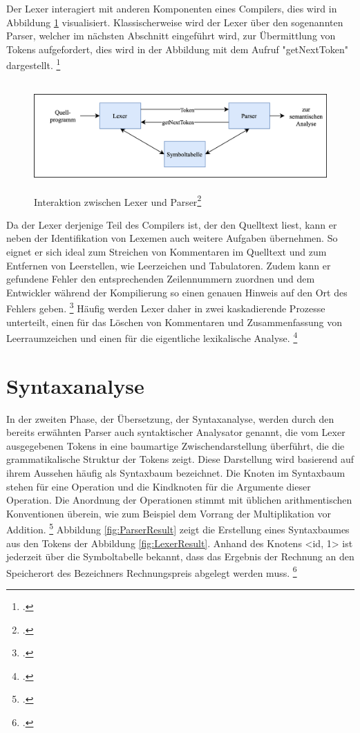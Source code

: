Der Lexer interagiert mit anderen Komponenten eines Compilers,  dies wird in Abbildung \ref{fig:LexerInteraktionen} visualisiert.  Klassischerweise wird der Lexer über den sogenannten Parser, welcher im nächsten Abschnitt eingeführt wird,  zur Übermittlung von Tokens aufgefordert,  dies wird in der Abbildung mit dem Aufruf "getNextToken" dargestellt.  \footcite[Vgl.][S. 135]{Ullmann2008} 

\begin{figure}[!ht]
 \includegraphics[width=14.5cm,height=4.11cm]{Images/Compiler/LexerParser.png}
 \caption[Interaktion zwischen Lexer und Parser]{Interaktion zwischen Lexer und Parser\protect\footcite{Ullmann2008}}
 \label{fig:LexerInteraktionen}
\end{figure}

Da der Lexer derjenige Teil des Compilers ist, der den Quelltext liest, kann er neben der Identifikation von Lexemen auch weitere Aufgaben übernehmen. So eignet er sich ideal zum Streichen von Kommentaren im Quelltext und zum Entfernen von Leerstellen,  wie Leerzeichen und Tabulatoren.  Zudem kann er gefundene Fehler den entsprechenden Zeilennummern zuordnen und dem Entwickler während der Kompilierung so einen genauen Hinweis auf den Ort des Fehlers geben.  \footcite[Vgl.][S. 135.]{Ullmann2008} 
Häufig werden Lexer daher in zwei kaskadierende Prozesse unterteilt, einen für das Löschen von Kommentaren und Zusammenfassung von Leerraumzeichen und einen für die eigentliche lexikalische Analyse.  \footcite[Vgl.][S. 136.]{Ullmann2008} 

\section{Syntaxanalyse}
In der zweiten Phase, der Übersetzung, der Syntaxanalyse,  werden durch den bereits erwähnten Parser auch syntaktischer Analysator genannt,  die vom Lexer ausgegebenen Tokens in eine baumartige Zwischendarstellung überführt, die die grammatikalische Struktur der Tokens zeigt.  Diese Darstellung wird basierend auf ihrem Aussehen häufig als Syntaxbaum bezeichnet.  Die Knoten im Syntaxbaum stehen für eine Operation und die Kindknoten für die Argumente dieser Operation.  Die Anordnung der Operationen stimmt mit üblichen arithmentischen Konventionen überein,  wie zum Beispiel dem Vorrang der Multiplikation vor Addition. \footcite[Vgl.][S. 9]{Ullmann2008} Abbildung \ref{fig:ParserResult} zeigt die Erstellung eines Syntaxbaumes aus den Tokens  der Abbildung  \ref{fig:LexerResult}.  Anhand des Knotens <id, 1> ist jederzeit über die Symboltabelle bekannt,  dass das Ergebnis der Rechnung an den Speicherort des Bezeichners Rechnungspreis abgelegt werden muss. \footcite[Vgl.][S. 9.]{Ullmann2008} 

